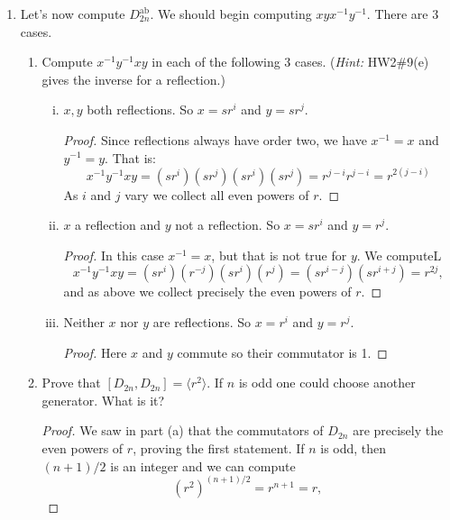 \documentclass[11pt]{article}
\newcommand{\la}{\langle}
\newcommand{\ra}{\rangle}
\newcommand{\ab}{\mathrm{ab}}
\begin{document}
\begin{enumerate}
\begin{enumerate}
\begin{proof}
      We make a remark that this is a sort of \textit{universal property}, in that $G^\ab$ is the universal abelianization of $G$.  I won't get into precisely what this means at the moment, but it can be understood via the slogan: Maps from $G$ to abelian things are the same as maps from $G^\ab$ to abelian things.
    \end{proof}
  \end{enumerate}
  \item Let's now compute $D_{2n}^\ab$.  We should begin computing $xyx^{-1}y^{-1}$.  There are 3 cases.
  \begin{enumerate}
    \item Compute $x^{-1}y^{-1}xy$ in each of the following 3 cases. (\textit{Hint:} HW2\#9(e) gives the inverse for a reflection.)
    \begin{enumerate}[(i)]
      \item $x,y$ both reflections.  So $x=sr^i$ and $y=sr^j$.
      \begin{proof}
        Since reflections always have order two, we have $x^{-1}=x$ and $y^{-1} = y$.  That is:
        \[x^{-1}y^{-1}xy = (sr^i)(sr^j)(sr^i)(sr^j) = r^{j-i}r^{j-i} = r^{2(j-i)}\]
        As $i$ and $j$ vary we collect all even powers of $r$.
      \end{proof}
      \item $x$ a reflection and $y$ not a reflection.  So $x=sr^i$ and $y=r^j$.
      \begin{proof}
        In this case $x^{-1}=x$, but that is not true for $y$.  We computeL
        \[x^{-1}y^{-1}xy = (sr^i)(r^{-j})(sr^i)(r^j) = (sr^{i-j})(sr^{i+j}) = r^{2j},\]
        and as above we collect precisely the even powers of $r$.
      \end{proof}
      \item Neither $x$ nor $y$ are reflections.  So $x=r^i$ and $y=r^j$.
      \begin{proof}
        Here $x$ and $y$ commute so their commutator is 1.
      \end{proof}
    \end{enumerate}
    \item Prove that $[D_{2n},D_{2n}] = \la r^2\ra$.  If $n$ is odd one could choose another generator.  What is it?
    \begin{proof}
      We saw in part (a) that the commutators of $D_{2n}$ are precisely the even powers of $r$, proving the first statement.  If $n$ is odd, then $(n+1)/2$ is an integer and we can compute
      \[(r^2)^{(n+1)/2} = r^{n+1} = r,\]

\end{proof}
\end{enumerate}
\end{enumerate}
\end{document}
